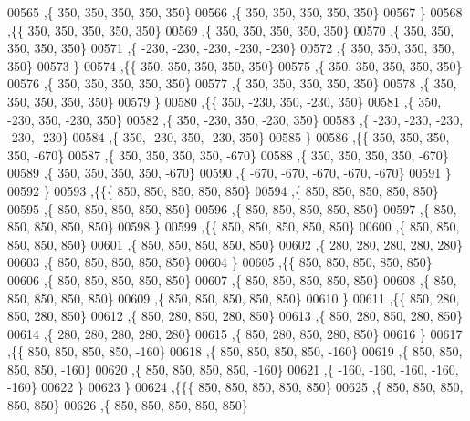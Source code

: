 \begin{DoxyCode}
00565    ,\{   350,   350,   350,   350,   350\}
00566    ,\{   350,   350,   350,   350,   350\}
00567    \}
00568   ,\{\{   350,   350,   350,   350,   350\}
00569    ,\{   350,   350,   350,   350,   350\}
00570    ,\{   350,   350,   350,   350,   350\}
00571    ,\{  -230,  -230,  -230,  -230,  -230\}
00572    ,\{   350,   350,   350,   350,   350\}
00573    \}
00574   ,\{\{   350,   350,   350,   350,   350\}
00575    ,\{   350,   350,   350,   350,   350\}
00576    ,\{   350,   350,   350,   350,   350\}
00577    ,\{   350,   350,   350,   350,   350\}
00578    ,\{   350,   350,   350,   350,   350\}
00579    \}
00580   ,\{\{   350,  -230,   350,  -230,   350\}
00581    ,\{   350,  -230,   350,  -230,   350\}
00582    ,\{   350,  -230,   350,  -230,   350\}
00583    ,\{  -230,  -230,  -230,  -230,  -230\}
00584    ,\{   350,  -230,   350,  -230,   350\}
00585    \}
00586   ,\{\{   350,   350,   350,   350,  -670\}
00587    ,\{   350,   350,   350,   350,  -670\}
00588    ,\{   350,   350,   350,   350,  -670\}
00589    ,\{   350,   350,   350,   350,  -670\}
00590    ,\{  -670,  -670,  -670,  -670,  -670\}
00591    \}
00592   \}
00593  ,\{\{\{   850,   850,   850,   850,   850\}
00594    ,\{   850,   850,   850,   850,   850\}
00595    ,\{   850,   850,   850,   850,   850\}
00596    ,\{   850,   850,   850,   850,   850\}
00597    ,\{   850,   850,   850,   850,   850\}
00598    \}
00599   ,\{\{   850,   850,   850,   850,   850\}
00600    ,\{   850,   850,   850,   850,   850\}
00601    ,\{   850,   850,   850,   850,   850\}
00602    ,\{   280,   280,   280,   280,   280\}
00603    ,\{   850,   850,   850,   850,   850\}
00604    \}
00605   ,\{\{   850,   850,   850,   850,   850\}
00606    ,\{   850,   850,   850,   850,   850\}
00607    ,\{   850,   850,   850,   850,   850\}
00608    ,\{   850,   850,   850,   850,   850\}
00609    ,\{   850,   850,   850,   850,   850\}
00610    \}
00611   ,\{\{   850,   280,   850,   280,   850\}
00612    ,\{   850,   280,   850,   280,   850\}
00613    ,\{   850,   280,   850,   280,   850\}
00614    ,\{   280,   280,   280,   280,   280\}
00615    ,\{   850,   280,   850,   280,   850\}
00616    \}
00617   ,\{\{   850,   850,   850,   850,  -160\}
00618    ,\{   850,   850,   850,   850,  -160\}
00619    ,\{   850,   850,   850,   850,  -160\}
00620    ,\{   850,   850,   850,   850,  -160\}
00621    ,\{  -160,  -160,  -160,  -160,  -160\}
00622    \}
00623   \}
00624  ,\{\{\{   850,   850,   850,   850,   850\}
00625    ,\{   850,   850,   850,   850,   850\}
00626    ,\{   850,   850,   850,   850,   850\}

\end{DoxyCode}
